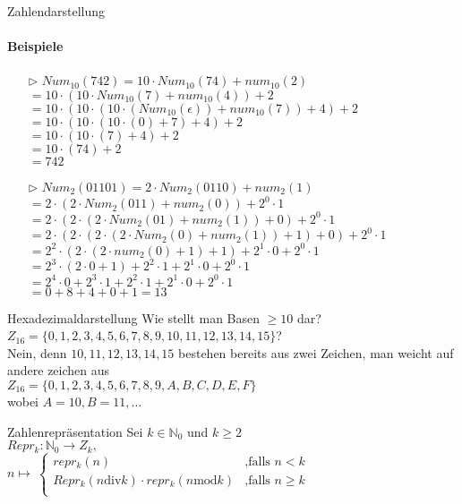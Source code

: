 \begin{frame}{Zahlendarstellung}
	\framesubtitle{Beispiele}
	\begin{enumerate}
		\item[$\triangleright$] $Num_{10}(742)=10\cdot Num_{10}(74)+num_{10}(2)$\\
		      $=10\cdot(10\cdot Num_{10}(7)+num_{10}(4))+2$\\
		      $=10\cdot(10\cdot(10\cdot (Num_{10}(\epsilon))+num_{10}(7))+4)+2$\\%
		      $=10\cdot(10\cdot(10\cdot (0)+7)+4)+2$\\
		      $=10\cdot(10\cdot(7)+4)+2$\\
		      $=10\cdot(74)+2$\\
		      $=742$\\
		\item[$\triangleright$] $Num_{2}(01101)=2\cdot Num_{2}(0110)+num_{2}(1)$\\
		      $=2\cdot(2\cdot Num_{2}(011)+num_{2}(0))+2^{0}\cdot1$\\
		      $=2\cdot(2\cdot (2\cdot Num_{2}(01)+num_{2}(1))+0)+2^{0}\cdot1$\\
		      $=2\cdot(2\cdot (2\cdot (2\cdot Num_{2}(0)+num_{2}(1))+1)+0)+2^{0}\cdot1$\\
		      $=2^{2}\cdot (2\cdot (2\cdot num_{2}(0)+1)+1)+2^{1}\cdot0+2^{0}\cdot1$\\
		      $=2^{3}\cdot (2\cdot 0+1)+2^{2}\cdot1+2^{1}\cdot0+2^{0}\cdot1$\\
		      $=2^{4}\cdot 0+2^{3}\cdot 1+2^{2}\cdot1+2^{1}\cdot0+2^{0}\cdot1$\\
		      $=0+8+4+0+1=13$
	\end{enumerate}
\end{frame}

\begin{frame}{Hexadezimaldarstellung}
	Wie stellt man Basen $\geq10$ dar?\\
	$Z_{16}=\{0,1,2,3,4,5,6,7,8,9,10,11,12,13,14,15\}$?\\
	Nein, denn $10,11,12,13,14,15$ bestehen bereits aus zwei Zeichen, man weicht auf andere zeichen aus\\
	$Z_{16}=\{0,1,2,3,4,5,6,7,8,9,A,B,C,D,E,F\}$\\
	wobei $A=10,B=11,\dots$\\
\end{frame}

\begin{frame}{Zahlenrepräsentation}
	Sei $k\in\mathbb{N}_{0}$ und $k\geq2$\\
	$Repr_{k}:\mathbb{N}_{0}\longrightarrow Z_{k},$\\
	$n\mapsto~
		\begin{cases}
			repr_{k}(n)                                        & \text{,falls $n<k$}     \\
			Repr_{k}(n\text{div}k)\cdot repr_{k}(n\text{mod}k) & \text{,falls $n\geq k$} \\
		\end{cases}$\\
	\\
\end{frame}

